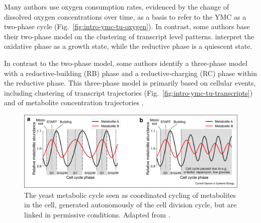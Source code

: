 Many authors \parencite{slavovMetabolicCyclingCell2011, murrayRedoxRegulationRespiring2011, caustonMetabolicRhythmsFramework2018} use oxygen consumption rates, evidenced by the change of dissolved oxygen concentrations over time, as a basis to refer to the YMC as a two-phase cycle (Fig.\ \ref{fig:intro-ymc-tu-oxygen}).
In contrast, some authors \parencite{machneYinYangYeast2012} base their two-phase model on the clustering of transcript level patterns.
\textcite{krishnaMinimalPushPull2018} interpret the oxidative phase as a growth state, while the reductive phase is a quiescent state.

In contrast to the two-phase model, some authors identify a three-phase model with a reductive-building (RB) phase and a reductive-charging (RC) phase within the reductive phase.
This three-phase model is primarily based on cellular events, including clustering of transcript trajectories \parencite{tuLogicYeastMetabolic2005} (Fig.\ \ref{fig:intro-ymc-tu-transcripts}) and of metabolite concentration trajectories \parencite{tuCyclicChangesMetabolic2007}.

\begin{figure}
  \centering
  \includegraphics[width=1.0\textwidth]{zylstraMetabolicDynamicsCell2022_1}
  \caption[
    The yeast metabolic cycle seen as coordinated cycling of metabolites in the cell
  ]{
    The yeast metabolic cycle seen as coordinated cycling of metabolites in the cell, generated autonomously of the cell division cycle, but are linked in permissive conditions.
    Adapted from \textcite{zylstraMetabolicDynamicsCell2022}.}
  \label{fig:intro-ymc-overview-ss}
\end{figure}


